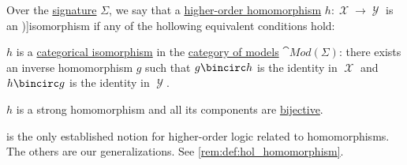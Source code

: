 \begin{definition}\label{def:hol_isomorphism}
  Over the \hyperref[def:hol_signature]{signature} \( \Sigma \), we say that a \hyperref[def:hol_homomorphism]{higher-order homomorphism} \( h: \mscrX \to \mscrY \) is an \term[en=isomorphism (\cite[245]{Andrews2002Logic})]{isomorphism} if any of the hollowing equivalent conditions hold:
  \begin{thmenum}
    \mimprovised \( h \) is a \hyperref[def:morphism_invertibility/isomorphism]{categorical isomorphism} in the \hyperref[def:hol_institution]{category of models} \( \cat{Mod}(\Sigma) \): there exists an inverse homomorphism \( g \) such that \( g \bincirc h \) is the identity in \( \mscrX \) and \( h \bincirc g \) is the identity in \( \mscrY \).

     \( h \) is a strong homomorphism and all its components are \hyperref[def:function_invertibility/bijective]{bijective}.
  \end{thmenum}
\end{definition}
\begin{comments}
  \item {} is the only established notion for higher-order logic related to homomorphisms. The others are our generalizations. See \cref{rem:def:hol_homomorphism}.
\end{comments}
